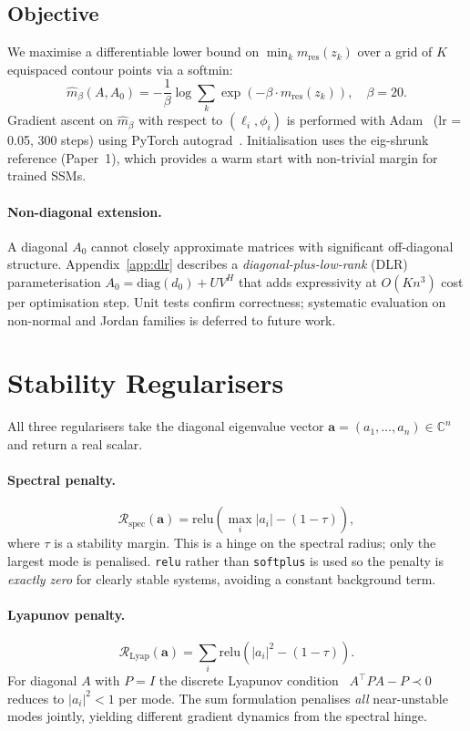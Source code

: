 \documentclass{article}
\theoremstyle{definition}
\newcommand{\C}{\mathbb{C}}
\newcommand{\abs}[1]{\left|#1\right|}
\begin{document}
\subsection{Objective}

We maximise a differentiable lower bound on $\min_k m_{\mathrm{res}}(z_k)$
over a grid of $K$ equispaced contour points via a softmin:
\[
  \hat{m}_\beta(A, A_0)
  = -\frac{1}{\beta}\log\sum_k \exp(-\beta \cdot m_{\mathrm{res}}(z_k)),
  \quad \beta = 20.
\]
Gradient ascent on $\hat{m}_\beta$ with respect to $(\ell_i, \phi_i)$
is performed with Adam~\cite{kingma2015adam} (lr = 0.05, 300 steps)
using PyTorch autograd~\cite{paszke2019pytorch}.
Initialisation uses the eig-shrunk reference (Paper~1), which provides
a warm start with non-trivial margin for trained SSMs.

\paragraph{Non-diagonal extension.}
A diagonal $A_0$ cannot closely approximate matrices with significant
off-diagonal structure.  Appendix~\ref{app:dlr} describes a
\emph{diagonal-plus-low-rank} (DLR) parameterisation
$A_0 = \mathrm{diag}(d_0) + UV^H$ that adds expressivity at $O(Kn^3)$
cost per optimisation step.  Unit tests confirm correctness; systematic
evaluation on non-normal and Jordan families is deferred to future work.

\section{Stability Regularisers}
\label{sec:regularisers}

All three regularisers take the diagonal eigenvalue vector
$\mathbf{a} = (a_1, \ldots, a_n) \in \C^n$ and return a real scalar.

\paragraph{Spectral penalty.}
\[
  \mathcal{R}_{\mathrm{spec}}(\mathbf{a}) = \mathrm{relu}\!\left(\max_i \abs{a_i} - (1 - \tau)\right),
\]
where $\tau$ is a stability margin.  This is a hinge on the spectral
radius; only the largest mode is penalised.  \texttt{relu} rather than
\texttt{softplus} is used so the penalty is \emph{exactly zero} for
clearly stable systems, avoiding a constant background term.

\paragraph{Lyapunov penalty.}
\[
  \mathcal{R}_{\mathrm{Lyap}}(\mathbf{a}) = \sum_i \mathrm{relu}\!\left(\abs{a_i}^2 - (1 - \tau)\right).
\]
For diagonal $A$ with $P = I$ the discrete Lyapunov
condition~\cite{miller2019stable} $A^\top P A - P \prec 0$
reduces to $\abs{a_i}^2 < 1$ per mode.  The sum formulation penalises
\emph{all} near-unstable modes jointly, yielding different gradient dynamics
from the spectral hinge.
\end{document}
